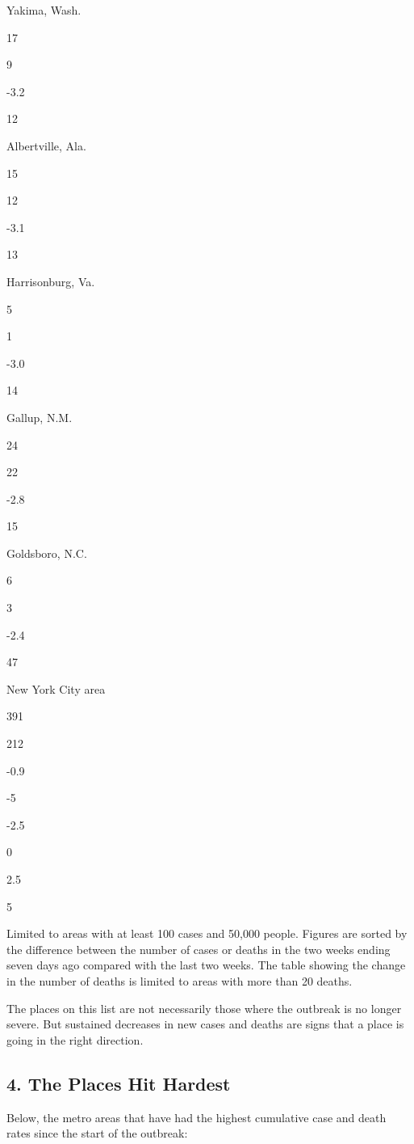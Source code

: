 Yakima, Wash.

17

9

-3.2

12

Albertville, Ala.

15

12

-3.1

13

Harrisonburg, Va.

5

1

-3.0

14

Gallup, N.M.

24

22

-2.8

15

Goldsboro, N.C.

6

3

-2.4

47

New York City area

391

212

-0.9

-5

-2.5

0

2.5

5

Limited to areas with at least 100 cases and 50,000 people. Figures are
sorted by the difference between the number of cases or deaths in the
two weeks ending seven days ago compared with the last two weeks. The
table showing the change in the number of deaths is limited to areas
with more than 20 deaths.

The places on this list are not necessarily those where the outbreak is
no longer severe. But sustained decreases in new cases and deaths are
signs that a place is going in the right direction.

\hypertarget{4-the-places-hit-hardest}{%
\subsection{4. The Places Hit Hardest}\label{4-the-places-hit-hardest}}

Below, the metro areas that have had the highest cumulative case and
death rates since the start of the outbreak:

